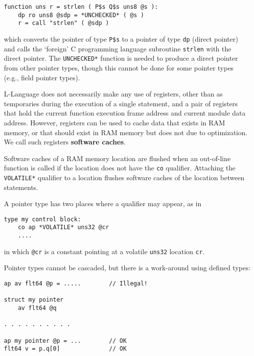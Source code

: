 \documentclass[12pt]{article}
\newcommand{\skey}[2]{{\rm \bfseries #1#2}}
\newenvironment{indpar}[1][0.3in]%
	{\begin{list}{}%
		     {\setlength{\itemsep}{0in}%
		      \setlength{\topsep}{0in}%
		      \setlength{\parsep}{1ex}%
		      \setlength{\labelwidth}{#1}%
		      \setlength{\leftmargin}{#1}%
		      \addtolength{\leftmargin}{\labelsep}}%
	 \item}%
	{\end{list}}
\begin{document}
\begin{indpar}\begin{verbatim}
function uns r = strlen ( P$s Q$s uns8 @s ):
    dp ro uns8 @sdp = *UNCHECKED* ( @s )
    r = call "strlen" ( @sdp )
\end{verbatim}\end{indpar}

which converts the pointer of type {\tt P\$s} to a pointer of
type {\tt dp} (direct pointer) and calls the `foreign' C programming
language subroutine {\tt strlen} with the direct pointer.
The {\tt *UNCHECKED*} function is needed to produce a direct pointer
from other pointer types, though this cannot be done for some pointer types
(e.g., field pointer types).

L-Language does not necessarily make any use of registers, other
than as temporaries during the execution of a single statement,
and a pair of registers that hold the current function
execution frame address and current module data address.
However, registers can be used to cache data that exists in
RAM memory, or that should exist in RAM memory but does not
due to optimization.  We call such registers
\skey{software cach}{es}.

Software caches of a RAM memory location are flushed when an out-of-line
function is called if the location does not have the {\tt co} qualifier.
Attaching the {\tt *VOLATILE*} qualifier to a location
flushes software caches of the location between statements.

A pointer type
has two places where a qualifier may appear, as in

\begin{indpar}\begin{verbatim}
type my control block:
    co ap *VOLATILE* uns32 @cr
    ....
\end{verbatim}\end{indpar}
in which {\tt @cr} is a constant pointing at a volatile
{\tt uns32} location {\tt cr}.

Pointer types cannot be cascaded, but there is a work-around
using defined types:
\begin{indpar}\begin{verbatim}
ap av flt64 @p = .....        // Illegal!

struct my pointer
    av flt64 @q

. . . . . . . . . .

ap my pointer @p = ...        // OK
flt64 v = p.q[0]              // OK
\end{verbatim}\end{indpar}
\end{document}
